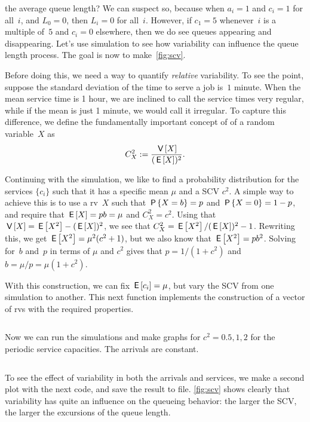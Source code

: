 \documentclass[stochastic-or.tex]{subfiles}
\begin{document}
 the average queue length?
We can suspect so, because when $a_{i}=1$ and $c_{i}=1$ for all~$i$, and $L_{0} = 0$,  then $L_{i} = 0$ for all~$i$.
However, if $c_{1}=5$ whenever~$i$ is a multiple of~$5$ and $c_{i}=0$ elsewhere, then we do see queues appearing and disappearing.
Let's use simulation to see how variability can influence the queue length process. The goal is now  to make~\cref{fig:scv}.

Before doing this, we need a way to quantify \emph{relative }variability.
To see the point, suppose the standard deviation of the time to serve a job is~$1$ minute.
When the mean service time is 1 hour, we are inclined to call the service times very regular, while if the mean is just 1 minute, we would call it irregular.
To capture this difference, we define the fundamentally important concept of  of a random variable~$X$  as
\begin{equation*}
 C^2_{X}:= \frac{\V X}{(\E X)^2}.
\end{equation*}


Continuing with the simulation, we like to find a probability distribution for the services $\{c_{i}\}$ such that it has a specific mean $\mu$ and a SCV $c^{2}$.
A simple  way to achieve this is to use a rv~$X$ such that $\P{X=b} = p$ and $\P{X=0} = 1-p$, and require that $\E X = p b= \mu$ and $C^2_X = c^{2}$.
Using that $\V X = \E{X^{2}} - (\E X)^{2}$, we see that $C^{2}_{X} = \E{X^{2}}/(\E X)^{2} - 1$.
Rewriting this, we get $\E{X^{2}} = \mu^{2}(c^2+1)$, but we also know that $\E{X^{2}} = p b^{2}$.
Solving for~$b$ and~$p$ in terms of $\mu$ and $c^{2}$ gives that $p = 1 / (1 + c^{2})$ and $b=\mu/p = \mu (1+c^{2})$.


With this construction, we can fix $\E{c_{i}}=\mu$, but vary the SCV from one simulation to another.
This next function implements the construction of a vector of rvs with the required properties.
\inputminted[firstline=92, lastline=98]{python}{../code/discrete_simulations.py} %

Now we can run the simulations and make graphs for $c^2=0.5, 1, 2$ for the periodic service capacities. The arrivals are constant.
\inputminted[firstline=105, lastline=117]{python}{../code/discrete_simulations.py} %

To see the effect of variability in both the arrivals and services, we make a second plot with the next code, and save the result to file.
\cref{fig:scv} shows clearly that variability has quite an influence on the queueing behavior: the larger the SCV, the larger the excursions of the queue length.
\inputminted[firstline=121, lastline=130]{python}{../code/discrete_simulations.py} %
\end{document}
